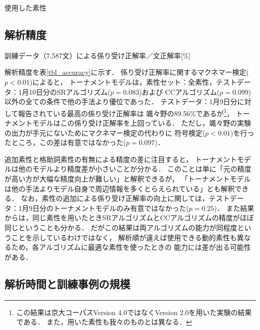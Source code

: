 \documentclass[japanese]{jnlp_1.4}
\begin{document}
\begin{table}[b]
\caption{使用した素性}
\begin{center}

\end{center}
\label{tbl_features}
\end{table}



\subsection{解析精度}
\label{sec:exp_acc}

\begin{table}[b]
\caption{訓練データ（7,587文）による係り受け正解率／文正解率[\%]}
\label{tbl_accuracy}
\begin{center}

\end{center}
\end{table} 

解析精度を表\ref{tbl_accuracy}に示す．
係り受け正解率に関するマクネマー検定($p < 0.01$)によると，
トーナメントモデルは，素性セット：全素性，テストデータ：1月10日分のSRアルゴリズム($p = 0.083$)および
CCアルゴリズム($p = 0.099$)以外の全ての条件で他の手法より優位であった．
テストデータ：1月9日分に対して報告されている最高の係り受け正解率は
颯々野の89.56\%であるが\footnote{
	この結果は京大コーパスVersion 4.0ではなくVersion 2.0を用いた実験の結果である．
	また，用いた素性も我々のものとは異なる．}，
トーナメントモデルはこの係り受け正解率を上回っている．
ただし，颯々野の実験の出力が手元にないためにマクネマー検定の代わりに
符号検定($p < 0.01$)を行ったところ，この差は有意ではなかった($p = 0.097$)．



追加素性と格助詞素性の有無による精度の差に注目すると，
トーナメントモデルは他のモデルより精度差が小さいことが分かる．
このことは単に「元の精度が高い方が大幅な精度向上が難しい」と解釈できるが，
「トーナメントモデルは他の手法よりモデル自身で周辺情報を多くとらえられている」とも解釈できる．
なお，素性の追加による係り受け正解率の向上に関しては，テストデータ：1月9日分のトーナメントモデルのみ有意ではなかった($p = 0.25$)．
また結果からは，同じ素性を用いたときSRアルゴリズムとCCアルゴリズムの精度がほぼ同じということも分かる．
だがこの結果は両アルゴリズムの能力が同程度ということを示しているわけではなく，
解析順が違えば使用できる動的素性も異なるため，各アルゴリズムに最適な素性を使ったときの
能力には差が出る可能性がある．

 
\subsection{解析時間と訓練事例の規模}
\end{document}
